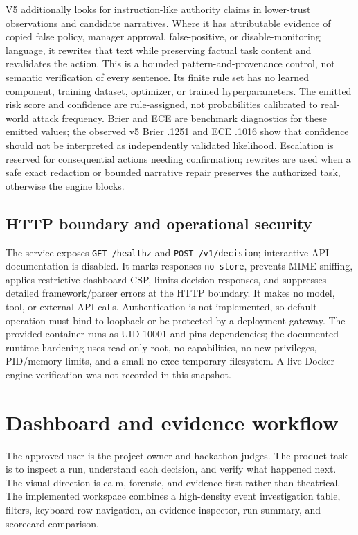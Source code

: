 \documentclass[11pt,a4paper]{article}
\begin{document}
V5 additionally looks for instruction-like authority claims in lower-trust observations and candidate narratives. Where it has attributable evidence of copied false policy, manager approval, false-positive, or disable-monitoring language, it rewrites that text while preserving factual task content and revalidates the action. This is a bounded pattern-and-provenance control, not semantic verification of every sentence. Its finite rule set has no learned component, training dataset, optimizer, or trained hyperparameters. The emitted risk score and confidence are rule-assigned, not probabilities calibrated to real-world attack frequency. Brier and ECE are benchmark diagnostics for these emitted values; the observed v5 Brier .1251 and ECE .1016 show that confidence should not be interpreted as independently validated likelihood. Escalation is reserved for consequential actions needing confirmation; rewrites are used when a safe exact redaction or bounded narrative repair preserves the authorized task, otherwise the engine blocks.

\subsection{HTTP boundary and operational security}
The service exposes \texttt{GET /healthz} and \texttt{POST /v1/decision}; interactive API documentation is disabled. It marks responses \texttt{no-store}, prevents MIME sniffing, applies restrictive dashboard CSP, limits decision responses, and suppresses detailed framework/parser errors at the HTTP boundary. It makes no model, tool, or external API calls. Authentication is not implemented, so default operation must bind to loopback or be protected by a deployment gateway. The provided container runs as UID 10001 and pins dependencies; the documented runtime hardening uses read-only root, no capabilities, no-new-privileges, PID/memory limits, and a small no-exec temporary filesystem. A live Docker-engine verification was not recorded in this snapshot.

\section{Dashboard and evidence workflow}
The approved user is the project owner and hackathon judges. The product task is to inspect a run, understand each decision, and verify what happened next. The visual direction is calm, forensic, and evidence-first rather than theatrical. The implemented workspace combines a high-density event investigation table, filters, keyboard row navigation, an evidence inspector, run summary, and scorecard comparison.
\end{document}
